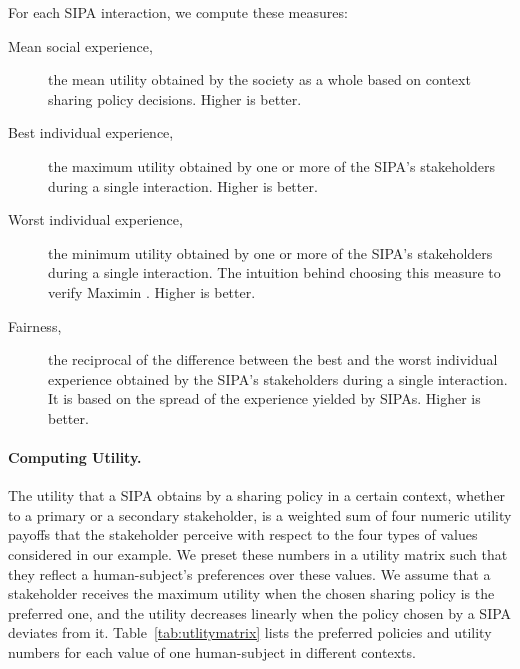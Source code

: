 For each SIPA interaction, we compute these measures:

\begin{description}
\item[Mean social experience,] the mean utility obtained by the society as a whole based on context sharing policy decisions. Higher is better.
\item[Best individual experience,] the maximum utility obtained by one or more of the SIPA's stakeholders during a single interaction. Higher is better.
\item[Worst individual experience,] the minimum utility obtained by one or more of the SIPA's stakeholders during a single interaction. The intuition behind choosing this measure to verify Maximin \citep{Leben2017Rawls}. Higher is better. 
\item[Fairness,] the reciprocal of the difference between the best and the worst individual experience obtained by the SIPA's stakeholders during a single interaction. It is based on the spread of the experience yielded by SIPAs. Higher is better. \citep{rawls1985justice}
\end{description}

\paragraph*{Computing Utility.} The utility that a SIPA obtains by a sharing policy in a certain context, whether to a primary or a secondary stakeholder, 
is a weighted sum of four numeric utility payoffs that the stakeholder perceive with respect to the four types of values considered in our example. We preset these numbers in a utility matrix such that they reflect a human-subject's preferences over these values. We assume that a stakeholder receives the maximum utility when the chosen sharing policy is the preferred one, and the utility decreases linearly when the policy chosen by a SIPA deviates from it. Table~\ref{tab:utlitymatrix} lists the preferred policies and utility numbers for each value of one human-subject in different contexts. 

